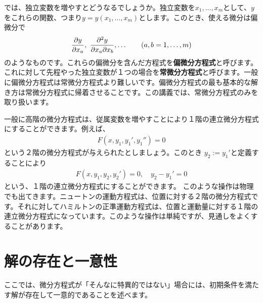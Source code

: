 \documentclass[report,paper=a4, fontsize=12pt, line_length=16cm, number_of_lines=33,dvipdfmx]{jlreq}
\numberwithin{equation}{section}
\newcommand{\strong}[1]{\textsf{\bfseries #1}}
\begin{document}
では、独立変数を増やすとどうなるでしょうか。独立変数を$x_1,\dots,x_m$として、$y$をこれらの関数、つまり$y=y(x_1,\dots,x_m)$とします。このとき、使える微分は偏微分で
\begin{align}
  \pdv{y}{x_a},\ \pdv{y}{x_a}{x_b},\dots\qquad (a,b=1,\dots,m)
\end{align}
のようなものです。これらの偏微分を含んだ方程式を\strong{偏微分方程式}と呼びます。これに対して先程やった独立変数が１つの場合を\strong{常微分方程式}と呼びます。一般に偏微分方程式は常微分方程式より難しいです。偏微分方程式の最も基本的な解き方は常微分方程式に帰着させることです。この講義では、常微分方程式のみを取り扱います。

一般に高階の微分方程式は、従属変数を増やすことにより１階の連立微分方程式にすることができます。例えば、
\begin{align}
  F(x,y_1,y_1',y_1'')=0
\end{align}
という２階の微分方程式が与えられたとしましょう。このとき
$y_2:=y_1'$と定義することにより
\begin{align}
  F(x,y_1,y_2,y_2')=0,\quad y_2-y_1'=0
\end{align}
という、１階の連立微分方程式にすることができます。
このような操作は物理でも出てきます。ニュートンの運動方程式は、位置に対する２階の微分方程式です。それに対してハミルトンの正準運動方程式は、位置と運動量に対する１階の連立微分方程式になっています。このような操作は単純ですが、見通しをよくすることがあります。

\section{解の存在と一意性}\label{sec:exsistenceofsolution}
ここでは、微分方程式が「そんなに特異的ではない」場合には、初期条件を満たす解が存在して一意的であることを述べます。
\end{document}
